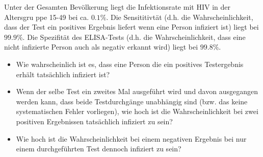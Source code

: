 
Unter der Gesamten Bevölkerung liegt die Infektionsrate mit HIV in der Altersgru
ppe 15-49 bei ca. $0.1\%$. Die Sensititivtät (d.h. die Wahrscheinlichkeit, dass der
Test ein positives Ergebnis liefert wenn eine Person infiziert ist) liegt bei
$99.9\%$. Die Spezifität des ELISA-Tests (d.h. die Wahrscheinlichkeit, dass eine
nicht infizierte Person auch als negativ erkannt wird) liegt bei $99.8\%$.

\begin{itemize}
	\item Wie wahrscheinlich ist es, dass eine Person die ein positives Testergebnis
		erhält tatsächlich infiziert ist?
	\item Wenn der selbe Test ein zweites Mal ausgeführt wird und davon ausgegangen
		werden kann, dass beide Testdurchgänge unabhängig sind (bzw.
		das keine systematischen Fehler vorliegen), wie hoch ist die Wahrscheinlichkeit
		bei zwei positiven Ergebnissen tatsächlich infiziert zu sein?
	\item Wie hoch ist die Wahrscheinlichkeit bei einem negativen Ergebnis bei nur
		einem durchgeführten Test dennoch infiziert zu sein?
\end{itemize}